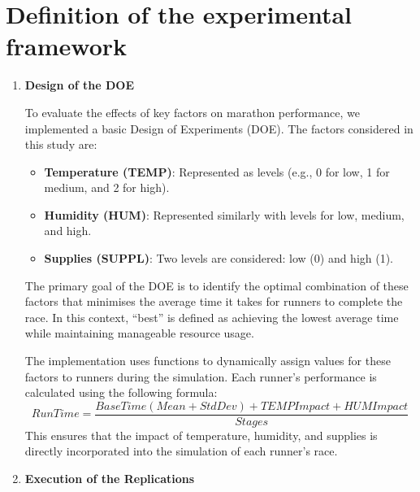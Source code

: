 \documentclass[conference]{IEEEtran}
\begin{document}
\section{Definition of the experimental framework}
\begin{enumerate}
    \item \textbf{Design of the DOE}
    
    To evaluate the effects of key factors on marathon performance, we implemented a basic Design of Experiments (DOE). The factors considered in this study are:
    \begin{itemize}
        \item \textbf{Temperature (TEMP)}: Represented as levels (e.g., 0 for low, 1 for medium, and 2 for high).
        \item \textbf{Humidity (HUM)}: Represented similarly with levels for low, medium, and high.
        \item \textbf{Supplies (SUPPL)}: Two levels are considered: low (0) and high (1).
    \end{itemize}
    The primary goal of the DOE is to identify the optimal combination of these factors that minimises the average time it takes for runners to complete the race. In this context, “best” is defined as achieving the lowest average time while maintaining manageable resource usage.
    
    The implementation uses functions to dynamically assign values for these factors to runners during the simulation. Each runner’s performance is calculated using the following formula:
    \[
        Run Time = \frac{BaseTime(Mean+StdDev)+TEMPImpact+HUMImpact}{Stages}
    \]
    This ensures that the impact of temperature, humidity, and supplies is directly incorporated into the simulation of each runner's race.
    \item \textbf{Execution of the Replications}
    

\end{enumerate}
\end{document}
